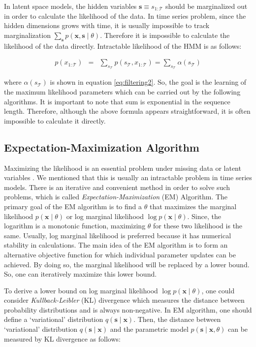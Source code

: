 In latent space models, the hidden variables $\boldsymbol{s} \equiv s_{1:\mathcal{T}}$ should be marginalized out in order to calculate the likelihood of the data. In time series problem, since the hidden dimensions grows with time, it is usually impossible to track marginalization $\sum_{\boldsymbol{s}} p(\boldsymbol{x}, \boldsymbol{s} \mid \theta)$. Therefore it is impossible to calculate the likelihood of the data directly. Intractable likelihood of the HMM is as follows:

\begin{eqnarray}
    p\left(x_{1 : \mathcal{T}}\right)& = &\sum_{s_{\mathcal{T}}} p\left(s_{\mathcal{T}}, x_{1 : \mathcal{T}}\right) = \sum_{s_{\mathcal{T}}} \alpha\left(s_{\mathcal{T}}\right)
\end{eqnarray}

where $\alpha\left(s_{\mathcal{T}}\right)$ is shown in equation \ref{eq:filtering2}. 
So, the goal is the learning of the maximum likelihood parameters \cite{barber2011bayesian} which can be carried out by the following algorithms.
It is important to note that sum is exponential in the sequence length. Therefore, although the above formula appears straightforward, it is often impossible to calculate it directly.

\subsection{Expectation-Maximization Algorithm}

Maximizing the likelihood is an essential problem under missing data or latent variables \cite{dempster1977maximum}.
We mentioned that this is usually an intractable problem in time series models.
There is an iterative and convenient method in order to solve such problems, which is called {\it Expectation-Maximization} (EM) Algorithm.
The primary goal of the EM algorithm is to find a $\theta$ that maximizes the marginal likelihood $p(\boldsymbol{x}\mid \theta)$ or log marginal likelihood $\log p(\boldsymbol{x}\mid \theta)$. 
Since, the logarithm is a monotonic function, maximizing $\theta$ for these two likelihood is the same.
Usually, log marginal likelihood is preferred because it has numerical stability in calculations.
The main idea of the EM algorithm is to form an alternative objective function for which individual parameter updates can be achieved.
By doing so, the marginal likelihood will be replaced by a lower bound.
So, one can iteratively maximize this lower bound. 

To derive a lower bound on log marginal likelihood $\log p(\boldsymbol{x}\mid \theta)$, one could consider {\it Kullback-Leibler} (KL) divergence which measures the distance between probability distributions and is always non-negative\cite{kullback1951information}. 
In EM algorithm, one should define a `variational' distribution $q\left(\boldsymbol{s}\mid \boldsymbol{x}\right)$.
Then, the distance between `variational' distribution $q\left(\boldsymbol{s}\mid \boldsymbol{x}\right)$ and the parametric model $p\left(\boldsymbol{s}\mid \boldsymbol{x}, \theta \right)$ can be measured by KL divergence as follows:


